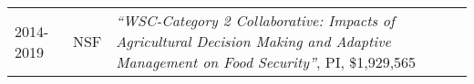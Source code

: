 \documentclass[10pt]{report}
\begin{document}
\begin{longtable}{ l p{.8in} p{5in}  }
2014-2019 & NSF & \emph{``WSC-Category 2 Collaborative: Impacts of Agricultural Decision Making and Adaptive Management on Food Security''}, PI, \$1,929,565 \\

% 
%
%
%
%
%
%	
%
%
%

\end{longtable}
\end{document}
